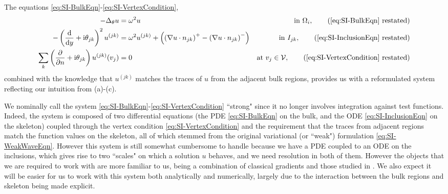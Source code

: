 The equations \eqref{eq:SI-BulkEqn}-\eqref{eq:SI-VertexCondition},
\begin{subequations}
	\begin{align*}
		-\laplacian_\qm u 
		&= \omega^2 u 
		&\text{in } \ddom_i, \tag{\eqref{eq:SI-BulkEqn} restated} \\
		- \bracs{\diff{}{y} + \rmi\qm_{jk}}^2u^{(jk)}  
		&= \omega^2 u^{(jk)} + \bracs{\bracs{\grad u\cdot n_{jk}}^+ - \bracs{\grad u\cdot n_{jk}}^-}
		&\text{in } I_{jk}, \tag{\eqref{eq:SI-InclusionEqn} restated} \\
		\sum_k \bracs{\pdiff{}{n}+\rmi\qm_{jk}} u^{(jk)}(v_j) 
		&= 0 
		&\text{at } v_j\in\vertSet, \tag{\eqref{eq:SI-VertexCondition} restated}
	\end{align*}
\end{subequations}
combined with the knowledge that $u^{(jk)}$ matches the traces of $u$ from the adjacent bulk regions, provides us with a reformulated system reflecting our intuition from (a)-(c).

We nominally call the system \eqref{eq:SI-BulkEqn}-\eqref{eq:SI-VertexCondition} ``strong" since it no longer involves integration against test functions.
Indeed, the system is composed of two differential equations (the PDE \eqref{eq:SI-BulkEqn} on the bulk, and the ODE \eqref{eq:SI-InclusionEqn} on the skeleton) coupled through the vertex condition \eqref{eq:SI-VertexCondition} and the requirement that the traces from adjacent regions match the function values on the skeleton, all of which stemmed from the original variational (or ``weak") formulation \eqref{eq:SI-WeakWaveEqn}.
However this system is still somewhat cumbersome to handle because we have a PDE coupled to an ODE on the inclusions, which gives rise to two ``scales" on which a solution $u$ behaves, and we need resolution in both of them.
However the objects that we are required to work with are more familiar to us, being a combination of classical gradients and those studied in . 
We also expect it will be easier for us to work with this system both analytically and numerically, largely due to the interaction between the bulk regions and skeleton being made explicit.

